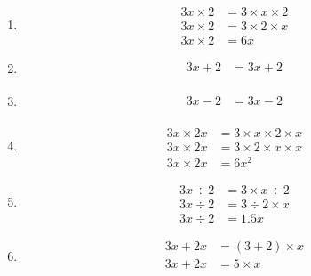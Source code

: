 \documentclass[12pt,a4paper]{article}
\begin{document}
		\begin{multicols}{3}
			
			\begin{enumerate}
				\item \begin{align*}
					3x \times 2 &= 3 \times x \times 2 \\
					3x \times 2 &= 3 \times 2 \times x \\
					3x \times 2 &= 6x 
				\end{align*}
				
				
				\item \begin{align*}
					3x +2 &= 3x +2\\
				\end{align*}
				
				\item \begin{align*}
					3x -2 &= 3x -2\\
				\end{align*}
				
				\item \begin{align*}
					3x \times 2x &= 3 \times x \times 2 \times x\\
					3x \times 2x &= 3 \times 2 \times x \times x \\
					3x \times 2x &= 6x^2 
				\end{align*}
				
				\item \begin{align*}
					3x \div 2 &= 3 \times x \div 2 \\
					3x \div 2 &= 3 \div 2 \times x \\
					3x \div 2 &= \num{1.5}x 
				\end{align*}
				
				
				\item \begin{align*}
					3x + 2x &= (3 + 2) \times x\\
					3x + 2x &= 5 \times x\\
				\end{align*}
			\end{enumerate}
		
		\end{multicols}
	
\end{document}
